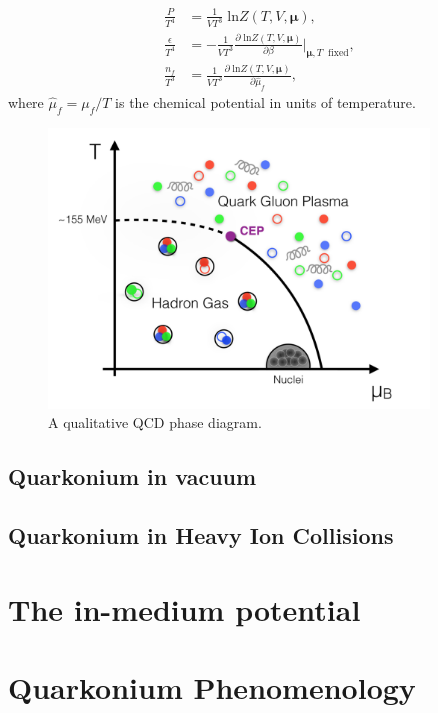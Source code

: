 \documentclass[12pt, a4paper, twoside]{book}
\newcommand{\brac}[1] {\!\left(#1\right)}
\begin{document}
\begin{align}
\label{tQCD_P}\frac{P}{T^4}&=\frac{1}{VT^3}\;\mathrm{ln}Z\brac{T,V,\bm{\mu}},\\
\label{tQCD_enden}\frac{\epsilon}{T^4}&=-\frac{1}{VT^3}\frac{\partial\;\mathrm{ln}Z\brac{T,V,\bm{\mu}}}{\partial\beta}\bigg\rvert_{\bm{\mu},T\;\;\mathrm{fixed}},\\
\label{tQCD_qn}\frac{n_f}{T^3}&=\frac{1}{VT^3}\frac{\partial\;\mathrm{ln}Z\brac{T,V,\bm{\mu}}}{\partial\hat{\mu}_f},
\end{align}
where \(\hat{\mu}_f=\mu_f/T\) is the chemical potential in units of temperature. 


\begin{figure}
	\centering
	\includegraphics[width=0.9\textwidth]{QCDphase}
	\caption{A qualitative QCD phase diagram.}\label{fig:QCDphasediag}
\end{figure}
\section{Quarkonium in vacuum}
\label{sec:quark_vac}
\onehalfspacing
\section{Quarkonium in Heavy Ion Collisions}
\label{sec:quark_HIC}
\onehalfspacing
\chapter{The in-medium potential}
\label{sec:med_pot}
\onehalfspacing
\chapter{Quarkonium Phenomenology}
\label{sec:quark_pheno}
\onehalfspacing
\end{document}
